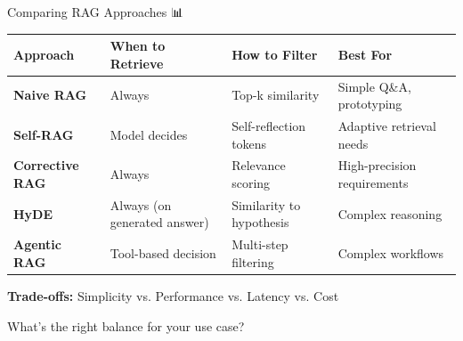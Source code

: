 \documentclass[aspectratio=169]{beamer}
\begin{document}
\begin{frame}{Comparing RAG Approaches 📊}
\begin{table}
\small
\begin{tabular}{l p{3cm} p{3cm} p{3.5cm}}
\toprule
\textbf{Approach} & \textbf{When to Retrieve} & \textbf{How to Filter} & \textbf{Best For} \\
\midrule
\textbf{Naive RAG} & Always & Top-k similarity & Simple Q\&A, prototyping \\
\addlinespace
\textbf{Self-RAG} & Model decides & Self-reflection tokens & Adaptive retrieval needs \\
\addlinespace
\textbf{Corrective RAG} & Always & Relevance scoring & High-precision requirements \\
\addlinespace
\textbf{HyDE} & Always (on generated answer) & Similarity to hypothesis & Complex reasoning \\
\addlinespace
\textbf{Agentic RAG} & Tool-based decision & Multi-step filtering & Complex workflows \\
\bottomrule
\end{tabular}
\end{table}

\vspace{1em}

\begin{thinkbox}
\textbf{Trade-offs:} Simplicity vs. Performance vs. Latency vs. Cost

What's the right balance for your use case?
\end{thinkbox}
\end{frame}
\end{document}
